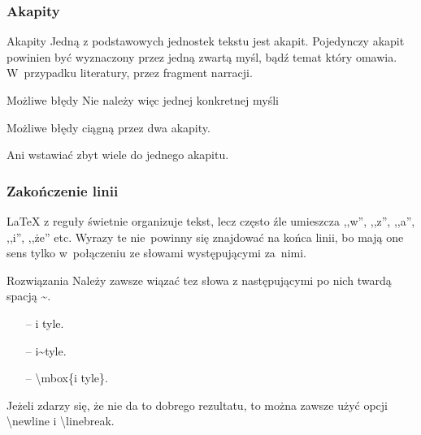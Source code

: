 \documentclass{beamer}  %
\begin{document}
\begin{frame}
  \frametitle{Akapity}

  \begin{block}{Akapity}
    Jedną z podstawowych jednostek tekstu jest akapit. Pojedynczy
    akapit powinien być wyznaczony przez jedną zwartą myśl, bądź temat
    który omawia. W~przypadku literatury, przez fragment narracji.
  \end{block}
  \pause

  \begin{block}{Możliwe błędy}
    Nie należy więc jednej konkretnej myśli
  \end{block}
  \pause

  \begin{block}{Możliwe błędy}
    ciągną przez dwa akapity.
  \end{block}

  \begin{block}{}
    Ani wstawiać zbyt wiele do jednego akapitu.
  \end{block}

\end{frame}



\begin{frame}
  \frametitle{Zakończenie linii}

  \begin{block}{}
    \LaTeX{ } z reguły świetnie organizuje tekst, lecz często źle
    umieszcza ,,w'', ,,z'', ,,a'', ,,i'', ,,że'' etc. Wyrazy te
    nie~powinny się znajdować na końca linii, bo mają one sens tylko
    w~połączeniu ze słowami występującymi za~nimi.
  \end{block}

  \begin{block}{Rozwiązania}
    Należy zawsze wiązać tez słowa z następującymi po nich twardą
    spacją \textasciitilde .
    \begin{itemize}
    \item[--] i tyle.
    \item[--] i\textasciitilde tyle.
    \item[--] \textbackslash mbox\{i tyle\}.
    \end{itemize}
  \end{block}

  \begin{block}{}
    Jeżeli zdarzy się, że nie da to dobrego rezultatu, to można zawsze
    użyć opcji \textbackslash newline i \textbackslash linebreak.
  \end{block}

\end{frame}
\end{document}
